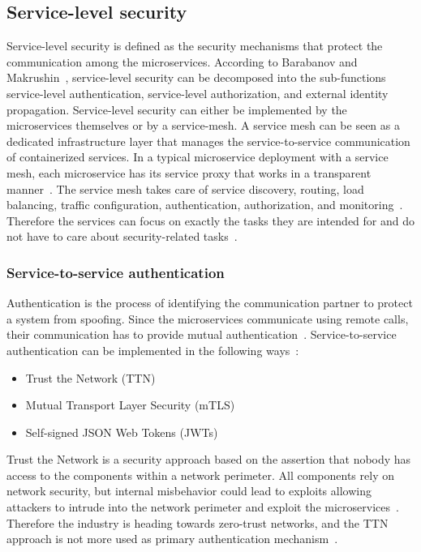 \subsection{Service-level security}
Service-level security is defined as the security mechanisms that protect the communication among the microservices.
According to Barabanov and Makrushin~\cite{barabanov2020authentication}, service-level security can be decomposed into the sub-functions service-level authentication, service-level authorization, and external identity propagation.
Service-level security can either be implemented by the microservices themselves or by a service-mesh.
A service mesh can be seen as a dedicated infrastructure layer that manages the service-to-service communication of containerized services.
In a typical microservice deployment with a service mesh, each microservice has its service proxy that works in a transparent manner~\cite{dias2020microservices}.
The service mesh takes care of service discovery, routing, load balancing, traffic configuration, authentication, authorization, and monitoring~\cite{chandramouli2019microservices}.
Therefore the services can focus on exactly the tasks they are intended for and do not have to care about security-related tasks~\cite{dias2020microservices}.

\subsubsection{Service-to-service authentication} 
\label{sec:service-to-service-authentication}
Authentication is the process of identifying the communication partner to protect a system from spoofing.
Since the microservices communicate using remote calls, their communication has to provide mutual authentication~\cite{dias2020microservices}.
Service-to-service authentication can be implemented in the following ways~\cite{dias2020microservices}:
\begin{itemize}
    \item Trust the Network (TTN)
    \item Mutual Transport Layer Security (mTLS)
    \item Self-signed JSON Web Tokens (JWTs)
\end{itemize}
Trust the Network is a security approach based on the assertion that nobody has access to the components within a network perimeter.
All components rely on network security, but internal misbehavior could lead to exploits allowing attackers to intrude into the network perimeter and exploit the microservices~\cite{zaheer2019eztrust}. 
Therefore the industry is heading towards zero-trust networks, and the TTN approach is not more used as primary authentication mechanism~\cite{barabanov2020authentication}.

